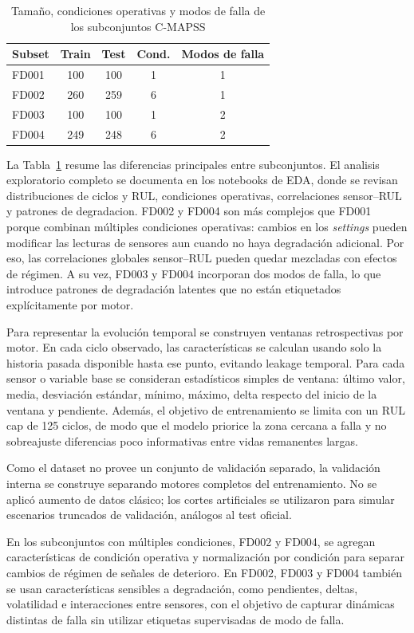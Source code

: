 \documentclass[conference, a4paper]{IEEEtran}
\begin{document}
\begin{table}[!h]
\caption{Tamaño, condiciones operativas y modos de falla de los subconjuntos C-MAPSS}
\label{tab:cmapss_subsets}
\centering
\begin{tabular}{lcccc}
\hline
Subset & Train & Test & Cond. & Modos de falla \\
\hline
FD001 & 100 & 100 & 1 & 1 \\
FD002 & 260 & 259 & 6 & 1 \\
FD003 & 100 & 100 & 1 & 2 \\
FD004 & 249 & 248 & 6 & 2 \\
\hline
\end{tabular}
\end{table}

La Tabla~\ref{tab:cmapss_subsets} resume las diferencias principales entre subconjuntos. El analisis exploratorio completo se documenta en los notebooks de EDA, donde se revisan distribuciones de ciclos y RUL, condiciones operativas, correlaciones sensor--RUL y patrones de degradacion. FD002 y FD004 son más complejos que FD001 porque combinan múltiples condiciones operativas: cambios en los \textit{settings} pueden modificar las lecturas de sensores aun cuando no haya degradación adicional. Por eso, las correlaciones globales sensor--RUL pueden quedar mezcladas con efectos de régimen. A su vez, FD003 y FD004 incorporan dos modos de falla, lo que introduce patrones de degradación latentes que no están etiquetados explícitamente por motor.

Para representar la evolución temporal se construyen ventanas retrospectivas por motor. En cada ciclo observado, las características se calculan usando solo la historia pasada disponible hasta ese punto, evitando leakage temporal. Para cada sensor o variable base se consideran estadísticos simples de ventana: último valor, media, desviación estándar, mínimo, máximo, delta respecto del inicio de la ventana y pendiente. Además, el objetivo de entrenamiento se limita con un RUL cap de 125 ciclos, de modo que el modelo priorice la zona cercana a falla y no sobreajuste diferencias poco informativas entre vidas remanentes largas.

Como el dataset no provee un conjunto de validación separado, la validación interna se construye separando motores completos del entrenamiento. No se aplicó aumento de datos clásico; los cortes artificiales se utilizaron para simular escenarios truncados de validación, análogos al test oficial.

En los subconjuntos con múltiples condiciones, FD002 y FD004, se agregan características de condición operativa y normalización por condición para separar cambios de régimen de señales de deterioro. En FD002, FD003 y FD004 también se usan características sensibles a degradación, como pendientes, deltas, volatilidad e interacciones entre sensores, con el objetivo de capturar dinámicas distintas de falla sin utilizar etiquetas supervisadas de modo de falla.
\end{document}
